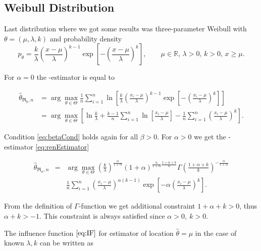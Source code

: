 \subsection{Weibull Distribution} 

Last distribution where we got some results was three-parameter Weibull with $\theta = (\mu,\lambda,k)$ and probability density
\begin{equation}
	p_\theta =  \frac{k}{\lambda} \left( \frac{x-\mu}{\lambda} \right)^{k-1} \exp \left[ -\left( \frac{x-\mu}{\lambda} \right)^k \right], \qquad \mu \in \mathbb{R}, \, \lambda>0, \, k>0, \, x \geq \mu.
\end{equation}

\noindent For $\alpha = 0$ the \mRa-estimator is equal to

\begin{align}
	\hat{\theta}_{\mathfrak{R}_0,n} & = \arg \max_{\theta \in \Theta} \frac{1}{n} \sum^n_{i=1} \ln \left[ \frac{k}{\lambda} \left( \frac{x_i-\mu}{\lambda} \right)^{k-1} 
	\exp \left[ -\left( \frac{x_i-\mu}{\lambda} \right)^k \right]\right] \nonumber \\
	&=\arg \max_{\theta \in \Theta}\left[ \ln \frac{k}{\lambda} + \frac{k-1}{n} \sum^n_{i=1} \ln \left[  \frac{x_i-\mu}{\lambda} \right] - 
	\frac{1}{n} \sum^n_{i=1} \left(  \frac{x_i-\mu}{\lambda} \right)^k \right].
\end{align}

\noindent Condition \eqref{eq:betaCond} holds again for all $\beta>0$. For $\alpha>0$ we get the \mRa-estimator \eqref{eq:renEstimator}

\begin{eqnarray}
	\hat{\theta}_{\mathfrak{R}_\alpha,n} & = & \arg \max_{\theta \in \Theta} \left( \frac{k}{\lambda} \right)^\frac{\alpha}{1+\alpha} (1+\alpha)^{\frac{\alpha}{1+\alpha}\frac{1+\alpha+k}{k}} 
	\Gamma\left(\frac{1+\alpha+k}{k}\right)^{-\frac{\alpha}{1+\alpha}} \nonumber \\
	&& \frac{1}{n}\sum_{i=1}^n \left( \frac{x_i-\mu}{\lambda}\right)^{\alpha(k-1)} \exp\left[-\alpha \left(\frac{x_i-\mu}{\lambda}\right)^k\right].
\end{eqnarray}

\noindent From the definition of $\Gamma$-function we get additional constraint  $1+\alpha+k>0$, thus $\alpha + k > -1$. This constraint is always satisfied since $\alpha > 0, \:k > 0.$

The influence function $\eqref{eq:IF}$ for estimator of location $\hat{\theta} = \mu$ in the case of known $\lambda, k $  can be written as

